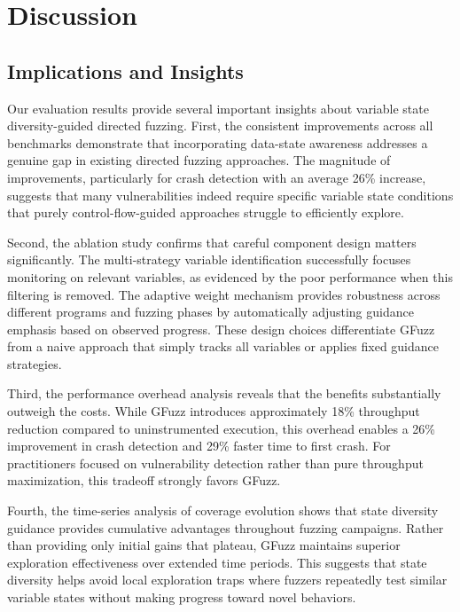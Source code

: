 \documentclass[review]{elsarticle}
\begin{document}
\section{Discussion}
\label{sec:discussion}

\subsection{Implications and Insights}

Our evaluation results provide several important insights about variable state diversity-guided directed fuzzing. First, the consistent improvements across all benchmarks demonstrate that incorporating data-state awareness addresses a genuine gap in existing directed fuzzing approaches. The magnitude of improvements, particularly for crash detection with an average 26\% increase, suggests that many vulnerabilities indeed require specific variable state conditions that purely control-flow-guided approaches struggle to efficiently explore.

Second, the ablation study confirms that careful component design matters significantly. The multi-strategy variable identification successfully focuses monitoring on relevant variables, as evidenced by the poor performance when this filtering is removed. The adaptive weight mechanism provides robustness across different programs and fuzzing phases by automatically adjusting guidance emphasis based on observed progress. These design choices differentiate GFuzz from a naive approach that simply tracks all variables or applies fixed guidance strategies.

Third, the performance overhead analysis reveals that the benefits substantially outweigh the costs. While GFuzz introduces approximately 18\% throughput reduction compared to uninstrumented execution, this overhead enables a 26\% improvement in crash detection and 29\% faster time to first crash. For practitioners focused on vulnerability detection rather than pure throughput maximization, this tradeoff strongly favors GFuzz.

Fourth, the time-series analysis of coverage evolution shows that state diversity guidance provides cumulative advantages throughout fuzzing campaigns. Rather than providing only initial gains that plateau, GFuzz maintains superior exploration effectiveness over extended time periods. This suggests that state diversity helps avoid local exploration traps where fuzzers repeatedly test similar variable states without making progress toward novel behaviors.
\end{document}

